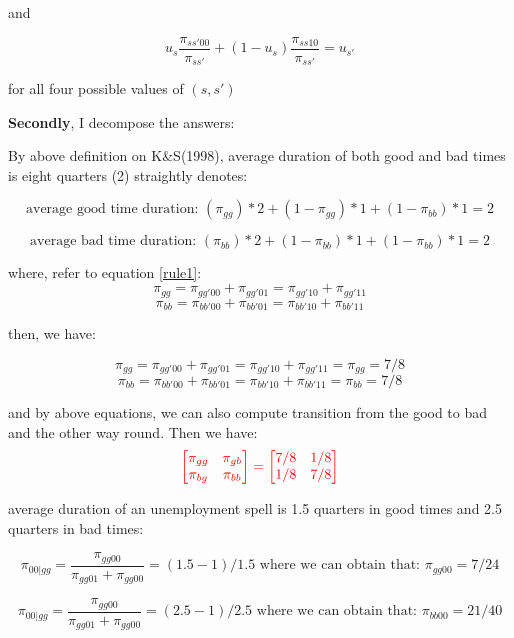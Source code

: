 and 

\begin{equation} \label{rule2}
u_s \frac{\pi_{ss' 00}}{\pi_{ss'}} + (1-u_s) \frac{\pi_{ss10}}{\pi_{ss'}} = u_{s'}
\end{equation}  

for all four possible values of $(s,s')$

\textbf{Secondly}, I decompose the answers: 

{\color{red}{I.}} By above definition on K\&S(1998), average duration of both good and bad times is eight quarters (2) straightly denotes:

\[\text{average good time duration: } (\pi_{gg}) *2 + (1- \pi_{gg})*1 + (1-\pi_{bb})*1 = 2\]  

\[\text{average bad time duration: } (\pi_{bb}) * 2 + (1- \pi_{bb})*1 + (1-\pi_{bb})*1 = 2\]  

where, refer to equation \ref{rule1}: 
\[ \pi_{gg} = \pi_{gg' 00} + \pi_{gg' 01} = \pi_{gg' 10} + \pi_{gg' 11} \]
\[ \pi_{bb} = \pi_{bb' 00} + \pi_{bb' 01} = \pi_{bb' 10} + \pi_{bb' 11} \]

then, we have: 

\[ \pi_{gg} = \pi_{gg' 00} + \pi_{gg' 01} = \pi_{gg' 10} + \pi_{gg' 11} = \pi_{gg} = 7/8 \]
\[ \pi_{bb} = \pi_{bb' 00} + \pi_{bb' 01} = \pi_{bb' 10} + \pi_{bb' 11} = \pi_{bb} = 7/8 \]

and by above equations, we can also compute transition from the good to bad and the other way round. Then we have:
\begin{gather}
\textcolor{red}{
\begin{bmatrix}
\pi_{gg} & \pi_{gb} \\ \pi_{bg} & \pi_{bb} 
\end{bmatrix}
=
\begin{bmatrix}
7/8 & 1/8 \\ 1/8 & 7/8 
\end{bmatrix}
}\end{gather}



{\color{red}{II.}} average duration of an unemployment spell is 1.5 quarters in good times and 2.5 quarters in bad times:

\[ \pi_{00|gg} = \frac{\pi_{gg00}}{\pi_{gg01}+\pi_{gg00}} = (1.5-1)/1.5 \text{ where we can obtain that: } \pi_{gg00}=7/24\] 

\[ \pi_{00|gg} = \frac{\pi_{gg00}}{\pi_{gg01}+\pi_{gg00}} = (2.5-1)/2.5 \text{ where we can obtain that: } \pi_{bb00}=21/40\] 

